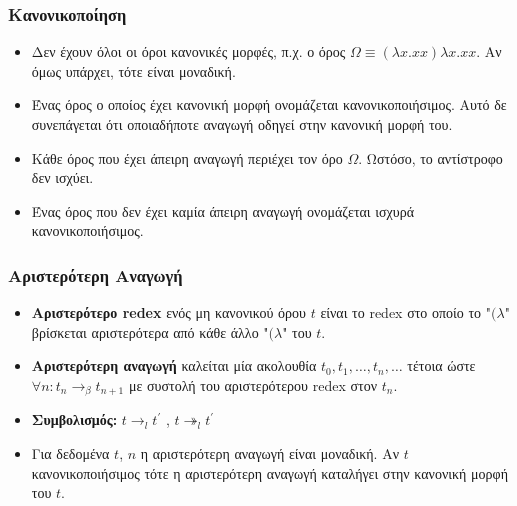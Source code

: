 \documentclass{beamer}
\begin{document}
\begin{frame}
  \frametitle{Κανονικοποίηση}
  \begin{itemize}
  \item Δεν έχουν όλοι οι όροι κανονικές μορφές, π.χ. ο όρος $\Omega
    \equiv (\lambda x . xx) \lambda x . xx$. Αν όμως υπάρχει, τότε
    είναι μοναδική.
  \item Ένας όρος ο οποίος έχει κανονική μορφή ονομάζεται
    κανονικοποιήσιμος. Αυτό δε συνεπάγεται ότι οποιαδήποτε αναγωγή
    οδηγεί στην κανονική μορφή του.
  \item Κάθε όρος που έχει άπειρη αναγωγή περιέχει τον όρο
    $\Omega$. Ωστόσο, το αντίστροφο δεν ισχύει.
  \item Ένας όρος που δεν έχει καμία άπειρη αναγωγή ονομάζεται ισχυρά
    κανονικοποιήσιμος.
  \end{itemize}
\end{frame}

\begin{frame}
  \frametitle{Αριστερότερη Αναγωγή}
  \begin{itemize}
  \item \textbf{Αριστερότερο redex} ενός μη κανονικού όρου $t$ είναι
    το redex στο οποίο το "$(\lambda$" βρίσκεται αριστερότερα από κάθε
    άλλο "$(\lambda$" του $t$.
  \item \textbf{Αριστερότερη αναγωγή} καλείται μία ακολουθία $t_0,
    t_1, \ldots, t_n, \ldots$ τέτοια ώστε $\forall n: t_n \rightarrow
    _\beta t_{n+1}$ με συστολή του αριστερότερου redex στον
    $t_n$.
  \item \textbf{Συμβολισμός:} $t \rightarrow _l t^\prime$ , $t
    \twoheadrightarrow _l t^\prime$
  \item Για δεδομένα $t$, $n$ η αριστερότερη αναγωγή είναι
    μοναδική. Αν $t$ κανονικοποιήσιμος τότε η αριστερότερη αναγωγή
    καταλήγει στην κανονική μορφή του $t$.
  \end{itemize}
\end{frame}
\end{document}
